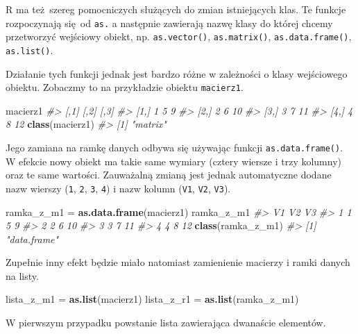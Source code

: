 \documentclass[paper=6in:9in,pagesize=pdftex,headinclude=on,footinclude=on,10pt]{scrbook}
\newenvironment{Shaded}{\begin{snugshade}}{\end{snugshade}}
\newcommand{\CommentTok}[1]{\textcolor[rgb]{0.56,0.35,0.01}{\textit{#1}}}
\newcommand{\KeywordTok}[1]{\textcolor[rgb]{0.13,0.29,0.53}{\textbf{#1}}}
\newcommand{\NormalTok}[1]{#1}
\newcommand{\StringTok}[1]{\textcolor[rgb]{0.31,0.60,0.02}{#1}}
\begin{document}
R ma też~szereg pomocniczych służących do zmian istniejących klas.
Te funkcje rozpoczynają się~od \texttt{as.} a następnie zawierają nazwę klasy do której chcemy przetworzyć wejściowy obiekt, np. \texttt{as.vector()}, \texttt{as.matrix()}, \texttt{as.data.frame()}, \texttt{as.list()}.

Działanie tych funkcji jednak jest bardzo różne w zależności o klasy wejściowego obiektu.
Zobaczmy to na przykładzie obiektu \texttt{macierz1}.

\begin{Shaded}
\begin{Highlighting}[]
\NormalTok{macierz1}
\CommentTok{#>      [,1] [,2] [,3]}
\CommentTok{#> [1,]    1    5    9}
\CommentTok{#> [2,]    2    6   10}
\CommentTok{#> [3,]    3    7   11}
\CommentTok{#> [4,]    4    8   12}
\KeywordTok{class}\NormalTok{(macierz1)}
\CommentTok{#> [1] "matrix"}
\end{Highlighting}
\end{Shaded}

Jego zamiana na ramkę danych odbywa się używając funkcji \texttt{as.data.frame()}.
W efekcie nowy obiekt ma takie same wymiary (cztery wiersze i trzy kolumny) oraz te same wartości.
Zauważalną zmianą jest jednak automatyczne dodane nazw wierszy (\texttt{1}, \texttt{2}, \texttt{3}, \texttt{4}) i nazw kolumn (\texttt{V1}, \texttt{V2}, \texttt{V3}).

\begin{Shaded}
\begin{Highlighting}[]
\NormalTok{ramka_z_m1 =}\StringTok{ }\KeywordTok{as.data.frame}\NormalTok{(macierz1)}
\NormalTok{ramka_z_m1}
\CommentTok{#>   V1 V2 V3}
\CommentTok{#> 1  1  5  9}
\CommentTok{#> 2  2  6 10}
\CommentTok{#> 3  3  7 11}
\CommentTok{#> 4  4  8 12}
\KeywordTok{class}\NormalTok{(ramka_z_m1)}
\CommentTok{#> [1] "data.frame"}
\end{Highlighting}
\end{Shaded}

Zupełnie inny efekt będzie miało natomiast zamienienie macierzy i ramki danych na listy.

\begin{Shaded}
\begin{Highlighting}[]
\NormalTok{lista_z_m1 =}\StringTok{ }\KeywordTok{as.list}\NormalTok{(macierz1)}
\NormalTok{lista_z_r1 =}\StringTok{ }\KeywordTok{as.list}\NormalTok{(ramka_z_m1)}
\end{Highlighting}
\end{Shaded}

W pierwszym przypadku powstanie lista zawierająca dwanaście elementów.
\end{document}
